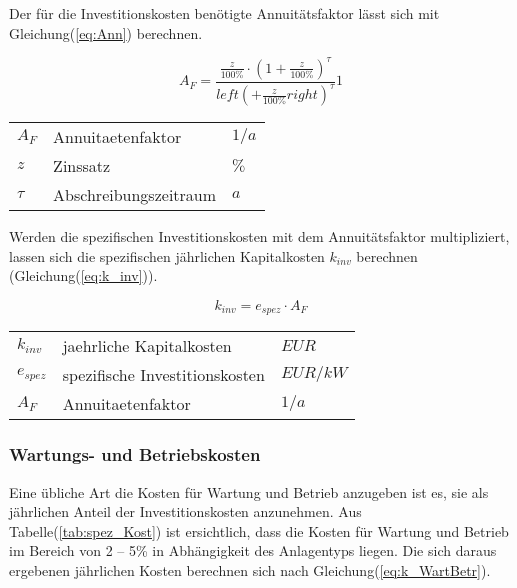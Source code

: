 \documentclass[onecolumn,10pt,titlepage]{article}
\begin{document}
				Der für die Investitionskosten benötigte Annuitätsfaktor lässt sich mit Gleichung(\ref{eq:Ann}) berechnen.\cite{Gluck.}

\begin{equation}
\label{eq:Ann}
	A_F=\frac{\frac{z}{100\%}\cdot\left(1+\frac{z}{100\%}\right)^{\tau}}{left(+\frac{z}{100\%}right)^{\tau}}1
\end{equation}

				\begin{table}[H]
					\begin{tabular*}{\textwidth}{lll}
						$A_F$&Annuitaetenfaktor&$1/a$\\
						$z$&Zinssatz&$\%$\\
						$\tau$&Abschreibungszeitraum&$a$\\

					\end{tabular*}
				\end{table}

				Werden die spezifischen Investitionskosten mit dem Annuitätsfaktor multipliziert, lassen sich die spezifischen jährlichen Kapitalkosten $k_{inv}$ berechnen (Gleichung(\ref{eq:k_inv})).\cite{Hey.26.Oktober2012}

				\begin{equation}
				\label{eq:k_inv}
				k_{inv} = e_{spez} \cdot A_F
				\end{equation}

				\begin{table}[H]
					\begin{tabular*}{\textwidth}{lll}
						$k_{inv}$&jaehrliche Kapitalkosten&$EUR$\\
						$e_{spez}$&spezifische Investitionskosten&$EUR/kW$\\
						$A_F$&Annuitaetenfaktor&$1/a$\\
					\end{tabular*}
				\end{table}

				\subsubsection*{Wartungs- und Betriebskosten}
				Eine übliche Art die Kosten für Wartung und Betrieb anzugeben ist es, sie als jährlichen Anteil der Investitionskosten anzunehmen. Aus Tabelle(\ref{tab:spez_Kost}) ist ersichtlich, dass die Kosten für Wartung und Betrieb im Bereich von 2 – 5\% in Abhängigkeit des Anlagentyps liegen. Die sich daraus ergebenen jährlichen Kosten berechnen sich nach Gleichung(\ref{eq:k_WartBetr}).\cite{Hey.26.Oktober2012}
\end{document}
